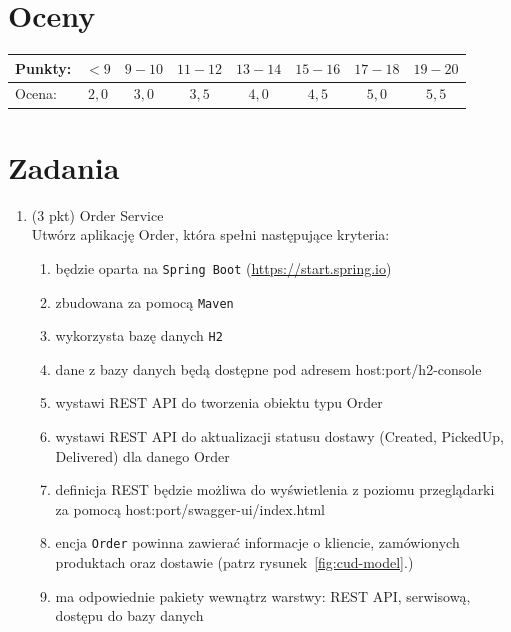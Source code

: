 \documentclass[12pt]{article}
\begin{document}
    \section*{Oceny}
    \begin{tabular}{|l|c|c|c|c|c|c|c|}
        \hline
        Punkty: & $<9$ & $9-10$ & $11-12$ & $13-14$ & $15-16$ & $17-18$ & $19-20$\\
        \hline
        Ocena: & $2,0$ & $3,0$ & $3,5$ & $4,0$ & $4,5$ & $5,0$ & $5,5$\\
        \hline
    \end{tabular}

    \section*{Zadania}
    \begin{enumerate}
        \item\label{exc:order_service}
            (3 pkt) Order Service\\
            Utwórz aplikację Order, która spełni następujące kryteria:
            \begin{enumerate}
                \item będzie oparta na \texttt{Spring Boot} (\url{https://start.spring.io})
                \item zbudowana za pomocą \texttt{Maven}
                \item wykorzysta bazę danych \texttt{H2} 
                \item dane z bazy danych będą dostępne pod adresem host:port/h2-console
                \item wystawi REST API do tworzenia obiektu typu Order
                \item wystawi REST API do aktualizacji statusu dostawy (Created, PickedUp, Delivered) dla danego Order
                \item definicja REST będzie możliwa do wyświetlenia z poziomu przeglądarki za pomocą host:port/swagger-ui/index.html
                \item encja \texttt{Order} powinna zawierać informacje o kliencie, zamówionych produktach oraz dostawie (patrz rysunek~\ref{fig:cud-model}.)
                \item ma odpowiednie pakiety wewnątrz warstwy: REST API, serwisową, dostępu do bazy danych
            \end{enumerate}


\end{enumerate}
\end{document}
